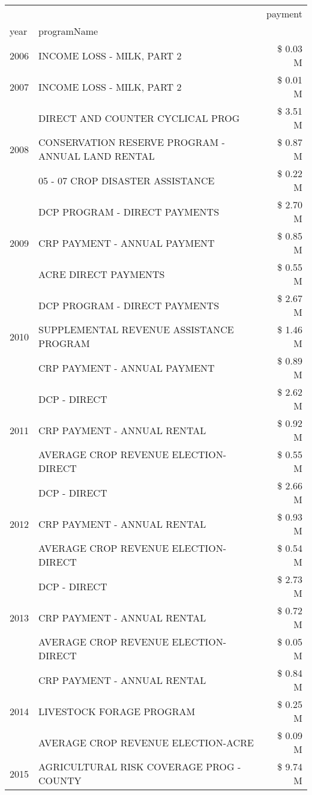 \begin{tabular}{llr}
\toprule
 &  & payment \\
year & programName &  \\
\midrule
2006 & INCOME LOSS - MILK, PART 2 & \$ 0.03 M \\
\cline{1-3}
2007 & INCOME LOSS - MILK, PART 2 & \$ 0.01 M \\
\cline{1-3}
\multirow[t]{3}{*}{2008} & DIRECT AND COUNTER CYCLICAL PROG & \$ 3.51 M \\
 & CONSERVATION RESERVE PROGRAM - ANNUAL LAND RENTAL & \$ 0.87 M \\
 & 05 - 07 CROP DISASTER ASSISTANCE & \$ 0.22 M \\
\cline{1-3}
\multirow[t]{3}{*}{2009} & DCP PROGRAM - DIRECT PAYMENTS & \$ 2.70 M \\
 & CRP PAYMENT - ANNUAL PAYMENT & \$ 0.85 M \\
 & ACRE DIRECT PAYMENTS & \$ 0.55 M \\
\cline{1-3}
\multirow[t]{3}{*}{2010} & DCP PROGRAM - DIRECT PAYMENTS & \$ 2.67 M \\
 & SUPPLEMENTAL REVENUE ASSISTANCE PROGRAM & \$ 1.46 M \\
 & CRP PAYMENT - ANNUAL PAYMENT & \$ 0.89 M \\
\cline{1-3}
\multirow[t]{3}{*}{2011} & DCP - DIRECT & \$ 2.62 M \\
 & CRP PAYMENT - ANNUAL RENTAL & \$ 0.92 M \\
 & AVERAGE CROP REVENUE ELECTION-DIRECT & \$ 0.55 M \\
\cline{1-3}
\multirow[t]{3}{*}{2012} & DCP - DIRECT & \$ 2.66 M \\
 & CRP PAYMENT - ANNUAL RENTAL & \$ 0.93 M \\
 & AVERAGE CROP REVENUE ELECTION-DIRECT & \$ 0.54 M \\
\cline{1-3}
\multirow[t]{3}{*}{2013} & DCP - DIRECT & \$ 2.73 M \\
 & CRP PAYMENT - ANNUAL RENTAL & \$ 0.72 M \\
 & AVERAGE CROP REVENUE ELECTION-DIRECT & \$ 0.05 M \\
\cline{1-3}
\multirow[t]{3}{*}{2014} & CRP PAYMENT - ANNUAL RENTAL & \$ 0.84 M \\
 & LIVESTOCK FORAGE PROGRAM & \$ 0.25 M \\
 & AVERAGE CROP REVENUE ELECTION-ACRE & \$ 0.09 M \\
\cline{1-3}
\multirow[t]{3}{*}{2015} & AGRICULTURAL RISK COVERAGE PROG - COUNTY & \$ 9.74 M \\

\end{tabular}
